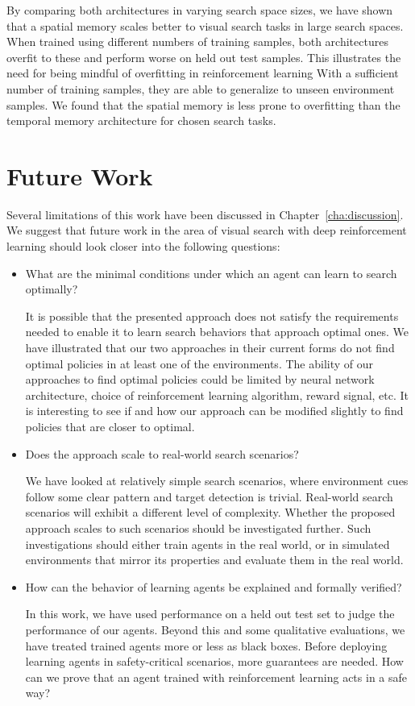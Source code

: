 By comparing both architectures in varying search space sizes, we have shown that a spatial memory scales better to visual search tasks in large search spaces.
When trained using different numbers of training samples, both architectures overfit to these and perform worse on held out test samples.
This illustrates the need for being mindful of overfitting in reinforcement learning
With a sufficient number of training samples, they are able to generalize to unseen environment samples.
We found that the spatial memory is less prone to overfitting than the temporal memory architecture for chosen search tasks.

\section{Future Work}

Several limitations of this work have been discussed in Chapter~\ref{cha:discussion}.
We suggest that future work in the area of visual search with deep reinforcement learning should look closer into the following questions:

\begin{itemize}
    \item What are the minimal conditions under which an agent can learn to search optimally?
    
    It is possible that the presented approach does not satisfy the requirements needed to enable it to learn search behaviors that approach optimal ones.
    We have illustrated that our two approaches in their current forms do not find optimal policies in at least one of the environments.
    The ability of our approaches to find optimal policies could be limited by neural network architecture, choice of reinforcement learning algorithm, reward signal, etc.
    It is interesting to see if and how our approach can be modified slightly to find policies that are closer to optimal.

    \item Does the approach scale to real-world search scenarios?

    We have looked at relatively simple search scenarios, where environment cues follow some clear pattern and target detection is trivial.
    Real-world search scenarios will exhibit a different level of complexity.
    Whether the proposed approach scales to such scenarios should be investigated further.
    Such investigations should either train agents in the real world, or in simulated environments that mirror its properties and evaluate them in the real world.

    \item How can the behavior of learning agents be explained and formally verified?
    
    In this work, we have used performance on a held out test set to judge the performance of our agents.
    Beyond this and some qualitative evaluations, we have treated trained agents more or less as black boxes. 
    Before deploying learning agents in safety-critical scenarios, more guarantees are needed.
    How can we prove that an agent trained with reinforcement learning acts in a safe way?
\end{itemize}

